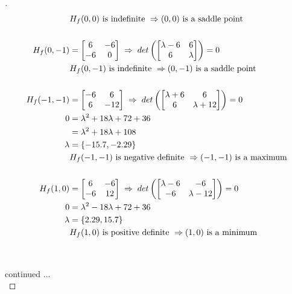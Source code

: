 \documentclass[12pt]{article}
\begin{document}
\begin{proof}[]
\begin{align*}
		& H_f(0, 0) \textnormal{ is indefinite } \Rightarrow (0,0) \textnormal{ is a saddle point} \\[15pt]
		H_f(0,-1) &= \begin{bmatrix} 6 & -6 \\ -6 & 0 \end{bmatrix} \; \Rightarrow \; det\left( \begin{bmatrix} \lambda -6 & 6 \\ 6 & \lambda \end{bmatrix} \right) = 0 \\
		& H_f(0, -1) \textnormal{ is indefinite } \Rightarrow (0,-1) \textnormal{ is a saddle point} \\[15pt]
		H_f(-1, -1) &= \begin{bmatrix} -6 & 6 \\ 6 & -12 \end{bmatrix} \; \Rightarrow \; det\left( \begin{bmatrix} \lambda + 6 & 6 \\ 6 & \lambda + 12 \end{bmatrix} \right) = 0 \\
		0 &= \lambda^2 + 18\lambda + 72 + 36 \\
		 &= \lambda^2 + 18\lambda + 108 \\
		\lambda &= \left\lbrace -15.7, -2.29 \right\rbrace \\
		& H_f(-1, -1) \textnormal{ is negative definite } \Rightarrow (-1, -1) \textnormal{ is a maximum} \\[15pt]
		H_f(1, 0) &= \begin{bmatrix} 6 & -6 \\ -6 & 12 \end{bmatrix} \; \Rightarrow \; det\left( \begin{bmatrix} \lambda - 6 & - 6 \\ - 6 & \lambda - 12 \end{bmatrix} \right) = 0 \\
		0 &= \lambda^2 - 18\lambda + 72 + 36 \\
		\lambda &= \left\lbrace 2.29, 15.7 \right\rbrace \\
		& H_f(1, 0) \textnormal{ is positive definite } \Rightarrow (1, 0)  \textnormal{ is a minimum} \\[15pt]
	\end{align*} \vspace{-10mm} \\
	continued ... \pagebreak \\ 

\end{proof}
\end{document}
